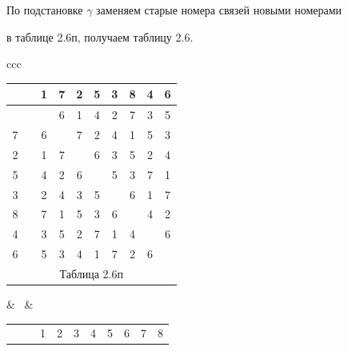 По подстановке $\gamma$ заменяем старые номера связей новыми номерами


в таблице 2.6п, получаем таблицу 2.6.


\smallskip





\begin{center}





\begin{tabular}{ccc}





\begin{tabular}{cccccccccc}


\ & \vline & 1 & 7 & 2 & 5 & 3 & 8 & 4 & 6 \\


\hline


 1 & \vline & \ & 6 & 1 & 4 & 2 & 7 & 3 & 5 \\


7 & \vline & 6 & \ & 7 & 2 & 4 & 1 & 5 & 3 \\


2 & \vline & 1 & 7 & \ & 6 & 3 & 5 & 2 & 4 \\


5 & \vline & 4 & 2 & 6 & \ & 5 & 3 & 7 & 1 \\


3 & \vline & 2 & 4 & 3 & 5 & \ & 6 & 1 & 7 \\


8 & \vline & 7 & 1 & 5 & 3 & 6 & \ & 4 & 2 \\


4 & \vline & 3 & 5 & 2 & 7 & 1 & 4 & \ & 6 \\


6 & \vline & 5 & 3 & 4 & 1 & 7 & 2 & 6 & \ \\


\multicolumn{10}{c}{ Таблица 2.6п}


\end{tabular}





& \ & 





\begin{tabular}{cccccccccc}


\ & \vline & 1 & 2 & 3 & 4 & 5 & 6 & 7 & 8 \\



\end{tabular}
\end{tabular}
\end{center}
